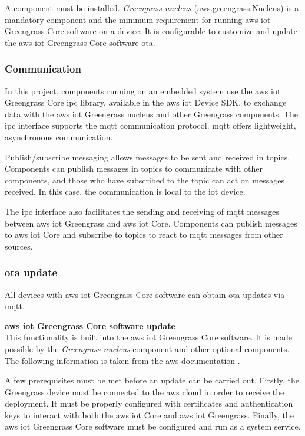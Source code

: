 A component must be installed. \textit{Greengrass nucleus} (aws.greengrass.Nucleus) is a mandatory component and the minimum requirement for running \gls{aws} \acrshort{iot} Greengrass Core software on a device. It is configurable to customize and update the \gls{aws} \acrshort{iot} Greengrass Core software \acrfull{ota}.

\subsubsection{Communication}
In this project, components running on an embedded system use the \gls{aws} \acrshort{iot} Greengrass Core \acrfull{ipc} library, available in the \gls{aws} \acrshort{iot} Device SDK, to exchange data with the \gls{aws} \acrshort{iot} Greengrass nucleus and other Greengrass components. The \acrshort{ipc} interface supports the \acrlong{mqtt} communication protocol. \acrshort{mqtt} offers lightweight, asynchronous communication.

Publish/subscribe messaging allows messages to be sent and received in topics. Components can publish messages in topics to communicate with other components, and those who have subscribed to the topic can act on messages received. In this case, the communication is local to the \acrshort{iot} device.

The \acrshort{ipc} interface also facilitates the sending and receiving of \acrshort{mqtt} messages between \gls{aws} \acrshort{iot} Greengrass and \gls{aws} \acrshort{iot} Core. Components can publish messages to \gls{aws} \acrshort{iot} Core and subscribe to topics to react to \acrshort{mqtt} messages from other sources.

\subsubsection{\acrshort{ota} update}
All devices with \gls{aws} \acrshort{iot} Greengrass Core software can obtain \acrshort{ota} updates via \acrshort{mqtt}.

\textbf{\gls{aws} \acrshort{iot} Greengrass Core software update}\\
This functionality is built into the \gls{aws} \acrshort{iot} Greengrass Core software. It is made possible by the \textit{Greengrass nucleus} component and other optional components. The following information is taken from the \gls{aws} documentation \cite{ota_aws_iot}.

A few prerequisites must be met before an update can be carried out. Firstly, the Greengrass device must be connected to the \gls{aws} \gls{cloud} in order to receive the deployment. It must be properly configured with certificates and authentication keys to interact with both the \gls{aws} \acrshort{iot} Core and \gls{aws} \acrshort{iot} Greengrass. Finally, the \gls{aws} \acrshort{iot} Greengrass Core software must be configured and run as a system service.

